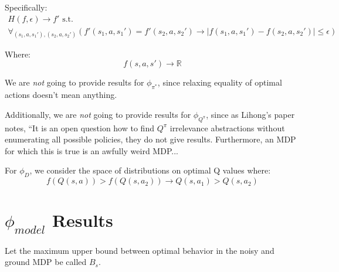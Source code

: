 \documentclass[11pt]{amsart}
\begin{document}
Specifically:
\begin{multline}
H(f, \epsilon) \rightarrow f' \text{  s.t.  } \\ \forall_{(s_1,a,s_1'),(s_2,a,s_2')} \left(f'(s_1,a,s_1') = f'(s_2,a,s_2') \rightarrow | f(s_1,a,s_1') - f(s_2,a,s_2') | \leq \epsilon\right)
\end{multline}

Where:
\begin{equation}
f(s,a,s') \rightarrow \mathbb{R}
\end{equation}


 We are {\it not} going to provide results for $\phi_{\pi^*}$, since relaxing equality of optimal actions doesn't mean anything.

 Additionally, we are {\it not} going to provide results for $\phi_{Q^\pi}$, since as Lihong's paper notes, ``It is an open question how to find $Q^\pi$ irrelevance abstractions without enumerating all possible policies, they do not give results. Furthermore, an MDP for which this is true is an awfully weird MDP...

 For $\phi_D$, we consider the space of distributions on optimal Q values where:
\begin{equation}
f(Q(s,a)) > f(Q(s,a_2)) \rightarrow Q(s,a_1) > Q(s,a_2)
\end{equation}

\newpage
\section{$\phi_{model}$ Results}

Let the maximum upper bound between optimal behavior in the noisy and ground MDP be called $B_s$.
\end{document}
